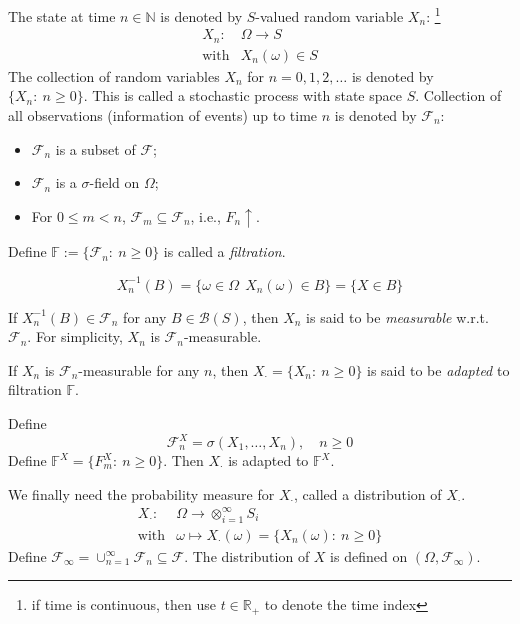 The state at time $n\in\mathbb{N}$ 
is denoted by $S$-valued random variable $X_n$:
\footnote{if time is continuous, then use $t\in\mathbb{R}_+$ to denote the time index}
\[
\begin{array}{ll}
X_n:&\Omega\to S\\
\mbox{with}&X_n(\omega)\in S
\end{array}
\]
The collection of random variables $X_n$ for $n=0,1,2,\ldots$ is denoted by $\{X_n:~n\ge0\}$.
This is called a stochastic process with state space $S$.
Collection of all observations (information of events) up to time $n$ is denoted by $\mathcal{F}_n$:
\begin{itemize}
\item
$\mathcal{F}_n$ is a subset of $\mathcal{F}$;
\item
$\mathcal{F}_n$ is a $\sigma$-field on $\Omega$;
\item
For $0\le m<n$, $\mathcal{F}_m\subseteq \mathcal{F}_n$, i.e., $F_n\uparrow$.
\end{itemize}
Define $\mathbb{F}:=\{\mathcal{F}_n:~n\ge0\}$ is called a \emph{filtration}.

\[
X_n^{-1}(B)=\{\omega\in\Omega~~X_n(\omega)\in B\}=\{X\in B\}
\]
\begin{definition}[measurable]
If $X_n^{-1}(B)\in\mathcal{F}_n$ for any $B\in\mathcal{B}(S)$, then $X_n$ is said to be \emph{measurable} w.r.t. $\mathcal{F}_n$. For simplicity, $X_n$ is $\mathcal{F}_n$-measurable.
\end{definition}

\begin{definition}[adapted]
If $X_n$ is $\mathcal{F}_n$-measurable for any $n$, then $X_{\cdot}=\{X_n:~n\ge0\}$ is said to be \emph{adapted} to filtration $\mathbb{F}$.
\end{definition}

\begin{example}
Define
\[
\mathcal{F}_n^X=\sigma(X_1,\ldots,X_n),\quad n\ge0
\]
Define $\mathbb{F}^X=\{F_m^X:~n\ge0\}$.
Then $X_{\cdot}$ is adapted to $\mathbb{F}^X$.
\end{example}

We finally need the probability measure for $X_{\cdot}$, called a distribution of $X_{\cdot}$.
\[
\begin{array}{ll}
X_{\cdot}:&\Omega\to \otimes_{i=1}^\infty S_i\\
\mbox{with}&\omega\mapsto X_{\cdot}(\omega)=\{X_n(\omega):~n\ge0\}
\end{array}
\]
Define $\mathcal{F}_\infty = \cup_{n=1}^\infty \mathcal{F}_n\subseteq \mathcal{F}$.
The distribution of $X$ is defined on $(\Omega,\mathcal{F}_\infty)$.


